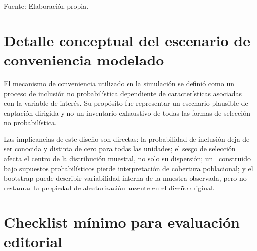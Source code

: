 \begin{flushleft}
\footnotesize Fuente: Elaboración propia.
\end{flushleft}

\section{Detalle conceptual del escenario de conveniencia modelado}
\label{app:conveniencia_modelada}

El mecanismo de conveniencia utilizado en la simulación se definió como un proceso de inclusión no probabilística dependiente de características asociadas con la variable de interés. Su propósito fue representar un escenario plausible de captación dirigida y no un inventario exhaustivo de todas las formas de selección no probabilística.

Las implicancias de este diseño son directas: la probabilidad de inclusión deja de ser conocida y distinta de cero para todas las unidades; el sesgo de selección afecta el centro de la distribución muestral, no solo su dispersión; un \IC\ construido bajo supuestos probabilísticos pierde interpretación de cobertura poblacional; y el bootstrap puede describir variabilidad interna de la muestra observada, pero no restaurar la propiedad de aleatorización ausente en el diseño original.

\section{Checklist mínimo para evaluación editorial}
\label{app:checklist}

